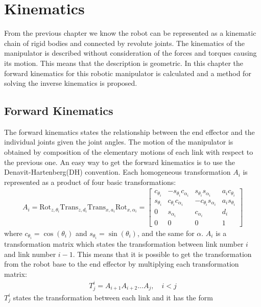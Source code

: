 \chapter{Kinematics}\label{chap:kinematics}
From the previous chapter we know the robot can be represented as a kinematic chain of rigid bodies and connected by revolute joints\cite{Siciliano}. The kinematics of the manipulator is described without consideration of the forces and torques causing its motion. This means that the description is geometric\cite{spong}. In this chapter the forward kinematics for this robotic manipulator is calculated and a method for solving the inverse kinematics is proposed. 

\section{Forward Kinematics}
The forward kinematics states the relationship between the end effector and the individual joints given the joint angles. The motion of the manipulator is obtained by composition of the elementary motions of each link with respect to the previous one\cite{Siciliano}. An easy way to get the forward kinematics is to use the Denavit-Hartenberg(DH) convention. Each homogeneous transformation $A_i$ is represented as a product of four basic transformations\cite{spong}: 
\begin{align}\label{eq:Ai}
A_i = \text{Rot}_{z,\theta_i}\text{Trans}_{z,d_i}\text{Trans}_{x,a_i}\text{Rot}_{x,\alpha_i}=
    \begin{bmatrix}
        c_{\theta_i} & -s_{\theta_i}c_{\alpha_i} & s_{\theta_i}s_{\alpha_i} & a_ic_{\theta_i}\\
        s_{\theta_i} & c_{\theta_i}c_{\alpha_i} & -c_{\theta_i}s_{\alpha_i} & a_is_{\theta_i}\\
        0 & s_{\alpha_i} & c_{\alpha_i} &d_i\\
        0 & 0 & 0 & 1
    \end{bmatrix}    
\end{align}
where $c_{\theta_i} = \cos{(\theta_i)}$ and $s_{\theta_i} = \sin{(\theta_i)}$, and the same for $\alpha$. $A_i$ is a transformation matrix which states the transformation between link number $i$ and link number $i-1$. This means that it is possible to get the transformation from the robot base to the end effector by multiplying each transformation matrix:
\begin{align*}
    T^i_j = A_{i+1}A_{i+2}...A_j, \quad i<j
\end{align*}
 $T^i_j$ states the transformation between each link and it has the form
